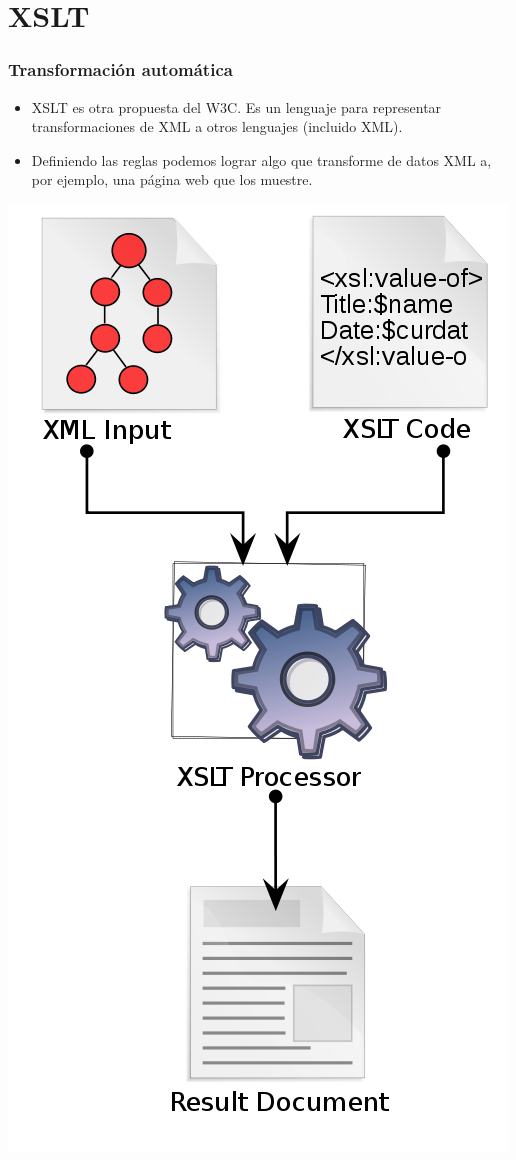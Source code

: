 \section{XSLT}

\begin{frame}
\frametitle{Transformación automática}
\begin{itemize}
\item	XSLT es otra propuesta del W3C. Es un lenguaje para
	representar transformaciones de XML a otros lenguajes
	(incluido XML).
	\pause

\item	Definiendo las reglas podemos lograr algo que transforme
	de datos XML a, por ejemplo, una página web que los muestre.
\end{itemize}
\end{frame}

\begin{frame}
\centering
\includegraphics[scale=0.25]{xslt}
\end{frame}

